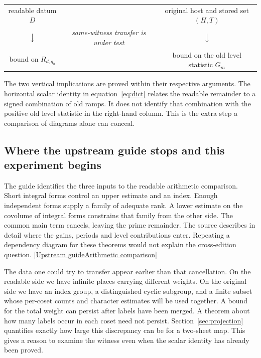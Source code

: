 \documentclass[12pt,letterpaper]{article}
\begin{document}
\begin{center}\small
\begin{tabular}{@{}c@{\quad}c@{\quad}c@{}}
readable datum $D$ & & original host and stored set $(H,T)$\\
$\big\downarrow$ & \emph{same-witness transfer is under test} & $\big\downarrow$\\
bound on $R_{d,q_0}$ & & bound on the old level statistic $G_m$\\
\end{tabular}
\end{center}
The two vertical implications are proved within their respective arguments. The horizontal scalar identity in equation~\eqref{eq:dict} relates the readable remainder to a signed combination of old ramps. It does not identify that combination with the positive old level statistic in the right-hand column. This is the extra step a comparison of diagrams alone can conceal.

\subsection{Where the upstream guide stops and this experiment begins}
The guide identifies the three inputs to the readable arithmetic comparison. Short integral forms control an upper estimate and an index. Enough independent forms supply a family of adequate rank. A lower estimate on the covolume of integral forms constrains that family from the other side. The common main term cancels, leaving the prime remainder. The source describes in detail where the gains, periods and level contributions enter. Repeating a dependency diagram for these theorems would not explain the cross-edition question.  {\footnotesize\sffamily\color{mute}[\href{https://github.com/leanprover-community/riemann-hypothesis/blob/e063a923620ee7787b4a1270421478645bf66bdb/GUIDE.md\#L1}{Upstream guide}\enspace \href{https://github.com/leanprover-community/riemann-hypothesis/blob/e063a923620ee7787b4a1270421478645bf66bdb/src/New/Reduction/MainInequality.lean\#L87}{Arithmetic comparison}]}

The data one could try to transfer appear earlier than that cancellation. On the readable side we have infinite places carrying different weights. On the original side we have an index group, a distinguished cyclic subgroup, and a finite subset whose per-coset counts and character estimates will be used together. A bound for the total weight can persist after labels have been merged. A theorem about how many labels occur in each coset need not persist. Section~\ref{sec:projection} quantifies exactly how large this discrepancy can be for a two-sheet map. This gives a reason to examine the witness even when the scalar identity has already been proved.
\end{document}
